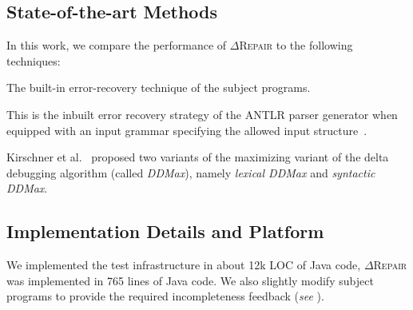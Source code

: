 \documentclass[acmsmall,screen,review,anonymous]{acmart}
\newcommand{\recheck}[1]{\textcolor{red}{#1}}
\newcommand{\approach}{\textsc{$\Delta$Repair}\xspace}
\newcommand{\ddmax}{\textit{DDMax}\xspace}
\begin{document}
\subsection{State-of-the-art Methods}
In this work, we compare the performance of \approach to the following
techniques:
\begin{description}[wide]
\item[\textbf{(1) Baseline:}] The built-in error-recovery technique of the subject programs.

\item[\textbf{(2) ANTLR:}] This is the inbuilt error recovery strategy of the ANTLR parser generator when equipped with an input grammar specifying the allowed input structure~\cite[Automatic Error Recovery Strategy]{parr2013definitive}.
\item[\textbf{(3) \ddmax:}] Kirschner et al.~\cite{kirschner2020debugging} proposed %
two variants of the maximizing variant of the delta debugging algorithm (called \ddmax), %
namely \textit{lexical \ddmax} and \textit{syntactic \ddmax}.
\end{description}


\subsection{Implementation Details and Platform}

We implemented the test infrastructure in about 12k LOC of Java code, \approach was implemented in 765 lines of Java code.
We also slightly modify subject programs %
to provide the required incompleteness feedback (\textit{see} ).
\end{document}
